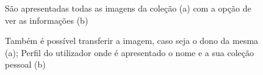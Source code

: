 \documentclass{report}
\begin{document}
\begin{figure}[H]
    \centering
    \qquad
    \caption{São apresentadas todas as imagens da coleção (a) com a opção de ver as informações (b)}
    \label{fig:resultados2}
\end{figure}

\begin{figure}[H]
    \centering
    \qquad
    \caption{Também é possível transferir a imagem, caso seja o dono da mesma (a); Perfil do utilizador onde é apresentado o nome e a sua coleção pessoal (b)}
    \label{fig:resultados3}
\end{figure}
\end{document}
